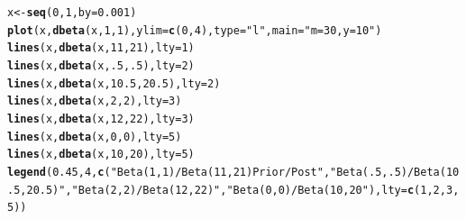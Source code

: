 \documentclass[12pt]{article}\usepackage[]{graphicx}\usepackage[]{color}
\makeatletter
\newcommand{\hlnum}[1]{\textcolor[rgb]{0.686,0.059,0.569}{#1}}%
\newcommand{\hlstr}[1]{\textcolor[rgb]{0.192,0.494,0.8}{#1}}%
\newcommand{\hlstd}[1]{\textcolor[rgb]{0.345,0.345,0.345}{#1}}%
\newcommand{\hlkwb}[1]{\textcolor[rgb]{0.69,0.353,0.396}{#1}}%
\newcommand{\hlkwc}[1]{\textcolor[rgb]{0.333,0.667,0.333}{#1}}%
\newcommand{\hlkwd}[1]{\textcolor[rgb]{0.737,0.353,0.396}{\textbf{#1}}}%
\newenvironment{kframe}{%
 \def\at@end@of@kframe{}%
 \ifinner\ifhmode%
  \def\at@end@of@kframe{\end{minipage}}%
  \begin{minipage}{\columnwidth}%
 \fi\fi%
 \def\FrameCommand##1{\hskip\@totalleftmargin \hskip-\fboxsep
 \colorbox{shadecolor}{##1}\hskip-\fboxsep
     \hskip-\linewidth \hskip-\@totalleftmargin \hskip\columnwidth}%
 \MakeFramed {\advance\hsize-\width
   \@totalleftmargin\z@ \linewidth\hsize
   \@setminipage}}%
 {\par\unskip\endMakeFramed%
 \at@end@of@kframe}
\newenvironment{knitrout}{}{} %
\makeatother
\begin{document}
\begin{knitrout}
\begin{kframe}
\begin{alltt}
\hlstd{x} \hlkwb{<-} \hlkwd{seq}\hlstd{(}\hlnum{0}\hlstd{,}\hlnum{1}\hlstd{,}\hlkwc{by}\hlstd{=}\hlnum{0.001}\hlstd{)}
\hlkwd{plot}\hlstd{(x,} \hlkwd{dbeta}\hlstd{(x,} \hlnum{1}\hlstd{,}\hlnum{1}\hlstd{),} \hlkwc{ylim}\hlstd{=}\hlkwd{c}\hlstd{(}\hlnum{0}\hlstd{,}\hlnum{4}\hlstd{),} \hlkwc{type}\hlstd{=}\hlstr{"l"}\hlstd{,} \hlkwc{main}\hlstd{=}\hlstr{"m=30, y=10"}\hlstd{)}
\hlkwd{lines}\hlstd{(x,} \hlkwd{dbeta}\hlstd{(x,} \hlnum{11}\hlstd{,}\hlnum{21}\hlstd{),} \hlkwc{lty}\hlstd{=}\hlnum{1}\hlstd{)}
\hlkwd{lines}\hlstd{(x,} \hlkwd{dbeta}\hlstd{(x,} \hlnum{.5}\hlstd{,}\hlnum{.5}\hlstd{),} \hlkwc{lty}\hlstd{=}\hlnum{2}\hlstd{)}
\hlkwd{lines}\hlstd{(x,} \hlkwd{dbeta}\hlstd{(x,} \hlnum{10.5}\hlstd{,} \hlnum{20.5}\hlstd{),} \hlkwc{lty}\hlstd{=}\hlnum{2}\hlstd{)}
\hlkwd{lines}\hlstd{(x,} \hlkwd{dbeta}\hlstd{(x,} \hlnum{2}\hlstd{,}\hlnum{2}\hlstd{),} \hlkwc{lty}\hlstd{=}\hlnum{3}\hlstd{)}
\hlkwd{lines}\hlstd{(x,} \hlkwd{dbeta}\hlstd{(x,} \hlnum{12}\hlstd{,} \hlnum{22}\hlstd{),} \hlkwc{lty}\hlstd{=}\hlnum{3}\hlstd{)}
\hlkwd{lines}\hlstd{(x,} \hlkwd{dbeta}\hlstd{(x,} \hlnum{0}\hlstd{,}\hlnum{0}\hlstd{),} \hlkwc{lty}\hlstd{=}\hlnum{5}\hlstd{)}
\hlkwd{lines}\hlstd{(x,} \hlkwd{dbeta}\hlstd{(x,} \hlnum{10}\hlstd{,} \hlnum{20}\hlstd{),} \hlkwc{lty}\hlstd{=}\hlnum{5}\hlstd{)}
\hlkwd{legend}\hlstd{(}\hlnum{0.45}\hlstd{,}\hlnum{4}\hlstd{,} \hlkwd{c}\hlstd{(}\hlstr{"Beta(1,1)/Beta(11,21) Prior/Post"}\hlstd{,} \hlstr{"Beta(.5,.5)/Beta(10.5,20.5)"}\hlstd{,} \hlstr{"Beta(2,2)/Beta(12,22)"}\hlstd{,} \hlstr{"Beta(0,0)/Beta(10,20"}\hlstd{),} \hlkwc{lty}\hlstd{=}\hlkwd{c}\hlstd{(}\hlnum{1}\hlstd{,}\hlnum{2}\hlstd{,}\hlnum{3}\hlstd{,}\hlnum{5}\hlstd{))}


\end{alltt}
\end{kframe}
\end{knitrout}
\end{document}
